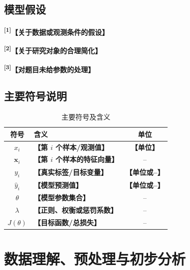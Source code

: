 \documentclass[UTF8,a4paper,12pt,fontset=fandol]{ctexart}
\newif\ifDraftAid
\newcommand{\ph}[1]{\textbf{\color{phg}【#1】}}
\newcommand{\detail}[1]{%
  \ifDraftAid\textnormal{\color{detailg}\small\,（参考写法：#1）}\fi}
\newcommand{\PHD}[2]{\ph{#1}\detail{#2}}
\newcommand{\SN}[1]{\textsuperscript{\color{noteg}\bfseries[#1]}}
\newcommand{\Note}[2]{\par\noindent\textbf{[#1]}\ #2}
\newcommand{\Annotated}[2]{%
\ifDraftAid
\noindent\begin{minipage}[t]{0.735\linewidth}\vspace{0pt}#1\end{minipage}\hfill
\begin{minipage}[t]{0.235\linewidth}\vspace{0pt}\footnotesize\color{noteg}\raggedright
\begin{tcolorbox}[colback=notebg,colframe=ruleg,boxrule=0.35pt,arc=1mm,left=1.2mm,right=1.2mm,top=1mm,bottom=1mm]
#2
\end{tcolorbox}\end{minipage}
\else
#1
\fi
}
\numberwithin{figure}{section}
\numberwithin{table}{section}
\begin{document}
\subsection{模型假设}
\Annotated{
\SN{1}\PHD{关于数据或观测条件的假设}{假设在〔研究时段或空间范围〕内，〔观测设备、采样方式或测量条件〕基本保持稳定，题目所给数据能够反映〔研究对象〕的主要变化规律，且〔较少出现的极端情况〕不在本文讨论范围内。}

\par\medskip
\SN{2}\PHD{关于研究对象的合理简化}{在单个〔时间窗口或局部区域〕内，假设〔外部条件或系统参数〕变化较小，因此可近似认为〔需要采用的关系〕成立，并据此进行后续计算；当该假设不再成立时，本文将在〔对应章节〕讨论其影响。}

\par\medskip
\SN{3}\PHD{对题目未给参数的处理}{对于题目未明确给出的〔参数或边界条件〕，参考〔题目条件、已有资料或合理范围〕取〔设定值〕。若该参数可能对结果产生较大影响，则在后文通过改变其取值考察结果的变化。}
}{
\Note{1}{只保留后续建模确实会用到的假设。}
\Note{2}{避免“数据完全真实可靠”等过强而且无法检验的假设。}
\Note{3}{若某个假设中的参数对结果影响较大，后文应考察其取值变化。}
}

\subsection{主要符号说明}
\begin{table}[H]
\centering\caption{主要符号及含义}\renewcommand{\arraystretch}{1.25}
\begin{tabularx}{0.88\textwidth}{c X c}
\toprule 符号 & 含义 & 单位\\ \midrule
$x_i$ & \ph{第 $i$ 个样本/观测值} & \ph{单位}\\
$\bm{x}_i$ & \ph{第 $i$ 个样本的特征向量} & --\\
$y_i$ & \ph{真实标签/目标变量} & \ph{单位或--}\\
$\hat y_i$ & \ph{模型预测值} & \ph{单位或--}\\
$\theta$ & \ph{模型参数集合} & --\\
$\lambda$ & \ph{正则、权衡或惩罚系数} & --\\
$J(\theta)$ & \ph{目标函数/总损失} & --\\ \bottomrule
\end{tabularx}
\end{table}

\section{数据理解、预处理与初步分析}
\end{document}
